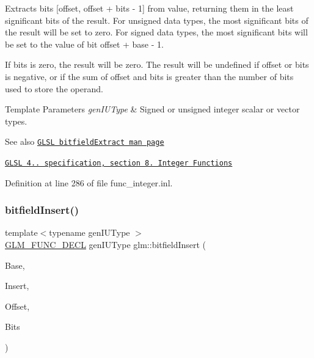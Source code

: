 Extracts bits \mbox{[}offset, offset + bits -\/ 1\mbox{]} from value, returning them in the least significant bits of the result. For unsigned data types, the most significant bits of the result will be set to zero. For signed data types, the most significant bits will be set to the value of bit offset + base -\/ 1.

If bits is zero, the result will be zero. The result will be undefined if offset or bits is negative, or if the sum of offset and bits is greater than the number of bits used to store the operand.


\begin{DoxyTemplParams}{Template Parameters}
{\em gen\+I\+U\+Type} & Signed or unsigned integer scalar or vector types.\\
\hline
\end{DoxyTemplParams}
\begin{DoxySeeAlso}{See also}
\href{http://www.opengl.org/sdk/docs/manglsl/xhtml/bitfieldExtract.xml}{\tt G\+L\+SL bitfield\+Extract man page} 

\href{http://www.opengl.org/registry/doc/GLSLangSpec.4.20.8.pdf}{\tt G\+L\+SL 4.. specification, section 8. Integer Functions} 
\end{DoxySeeAlso}


Definition at line 286 of file func\+\_\+integer.\+inl.

\mbox{\label{group__core__func__integer_ga7ab09972d52094d97d2480982e657dd0}} 
\subsubsection{\texorpdfstring{bitfield\+Insert()}{bitfieldInsert()}}
{\footnotesize\ttfamily template$<$typename gen\+I\+U\+Type $>$ \\
\hyperlink{setup_8hpp_ab2d052de21a70539923e9bcbf6e83a51}{G\+L\+M\+\_\+\+F\+U\+N\+C\+\_\+\+D\+E\+CL} gen\+I\+U\+Type glm\+::bitfield\+Insert (\begin{DoxyParamCaption}\item[{gen\+I\+U\+Type const \&}]{Base,  }\item[{gen\+I\+U\+Type const \&}]{Insert,  }\item[{int const \&}]{Offset,  }\item[{int const \&}]{Bits }\end{DoxyParamCaption})}

